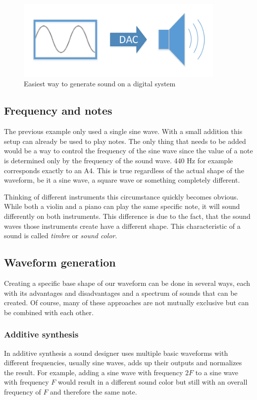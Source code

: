 	  	\begin{figure}[!h]
		\centering
			\includegraphics[width=0.90\textwidth]{images/sound_generation.pdf}
		\caption{Easiest way to generate sound on a digital system }
		\label{fig:sound_generation}
		\end{figure}
		
		\subsection{Frequency and notes}
		The previous example only used a single sine wave. 
		With a small addition this setup can already be used to play notes.
		The only thing that needs to be added would be a way to control the frequency of the sine wave since the value of a note is determined only by the frequency of the sound wave. 
		440 Hz for example corresponds exactly to an A4.
		This is true regardless of the actual shape of the waveform, be it a sine wave, a square wave or something completely different. 

		Thinking of different instruments this circumstance quickly becomes obvious. 
		While both a violin and a piano can play the same specific note, it will sound differently on both instruments.
		This difference is due to the fact, that the sound waves those instruments create have a different shape.
		This characteristic of a sound is called \emph{timbre} or \emph{sound color}.
		
		\subsection{Waveform generation}
		Creating a specific base shape of our waveform can be done in several ways, each with its advantages and disadvantages and a spectrum of sounds that can be created.
		Of course, many of these approaches are not mutually exclusive but can be combined with each other.
			\subsubsection{Additive synthesis}
				In additive synthesis a sound designer uses multiple basic waveforms with different frequencies, usually sine waves, adds up their outputs and normalizes the result.
				For example, adding a sine wave with frequency $2F$ to a sine wave with frequency $F$ would result in a different sound color but still with an overall frequency of $F$ and therefore the same note.
				
